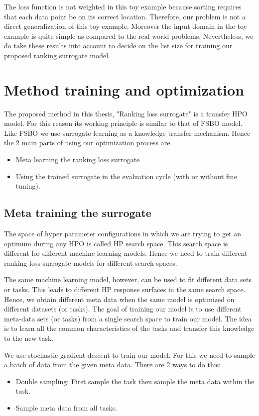 \documentclass[12pt, twoside, ngerman]{report}
\begin{document}
The loss function is not weighted in this toy example because sorting requires that each data point be on its correct location.
Therefore,  our problem is not a direct generalization of this toy example.
Moreover the input domain in the toy example is quite simple as compared to the real world problems.
Nevertheless,  we do take these results into account to decide on the list size for training our proposed ranking surrogate model.

\section{Method training and optimization}

The proposed method in this thesis, "Ranking loss surrogate" is a transfer HPO model.
For this reason its working principle is similar to that of FSBO model.
Like FSBO we use surrogate learning as a knowledge transfer mechanism.
Hence the 2 main parts of using our optimization process are
\begin{itemize}
\item Meta learning the ranking loss surrogate
\item Using the trained surrogate in the evaluation cycle (with or without fine tuning).
\end{itemize}

\subsection{Meta training the surrogate}\label{sec:rlmetatraining}

The space of hyper parameter configurations in which we are trying to get an optimum during any HPO is called HP search space.
This search space is different for different machine learning models.
Hence we need to train different ranking loss surrogate models for different search spaces.

The same machine learning model,  however,  can be used to fit different data sets or tasks.
This leads to different HP response surfaces in the same search space.
Hence,  we obtain different meta data when the same model is optimized on different datasets (or tasks).
The goal of training our model is to use different meta-data sets (or tasks) from a single search space to train our model.
The idea is to learn all the common characteristics of the tasks and transfer this knowledge to the new task.

We use stochastic gradient descent to train our model.
For this we need to sample a batch of data from the given meta data.
There are 2 ways to do this:
\begin{itemize}
\item Double sampling: First sample the task then sample the meta data within the task.
\item Sample meta data from all tasks.
\end{itemize}
\end{document}
